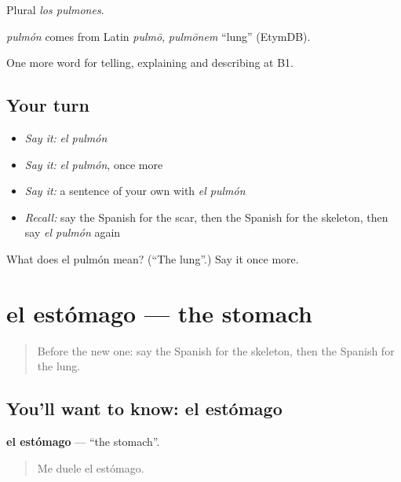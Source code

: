Plural \emph{los pulmones}.

\begin{cousinweb}
\emph{pulmón} comes from Latin \emph{pulmō}, \emph{pulmōnem} \textquotedblleft{}lung\textquotedblright{} (EtymDB).
\end{cousinweb}

\begin{grammarlens}[title={What you've built}]
One more word for telling, explaining and describing at B1.
\end{grammarlens}

\subsection*{Your turn}
\begin{itemize}
\raggedright
  \item \emph{Say it:} \emph{el pulmón}
  \item \emph{Say it:} \emph{el pulmón}, once more
  \item \emph{Say it:} a sentence of your own with \emph{el pulmón}
  \item \emph{Recall:} say the Spanish for the scar, then the Spanish for the skeleton, then say \emph{el pulmón} again
\end{itemize}

\begin{tcolorbox}[breakable,colback=teal!4,colframe=teal!35!black,title={Before you move on}]
What does el pulmón mean? (\textquotedblleft{}The lung\textquotedblright{}.) Say it once more.
\end{tcolorbox}
\section[el estómago]{el estómago — the stomach}

\label{lesson:ES-C735-estomago}



\begin{quote}
Before the new one: say the Spanish for the skeleton, then the Spanish for the lung.
\end{quote}

\subsection*{You'll want to know: el estómago}
\textbf{el estómago} — \textquotedblleft{}the stomach\textquotedblright{}.

\begin{quote}
Me duele el estómago.
\end{quote}

